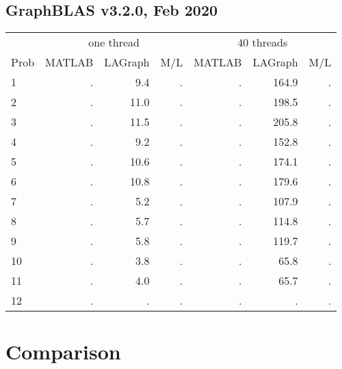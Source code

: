 \documentclass[12pt]{article}
\begin{document}
\subsection{GraphBLAS v3.2.0, Feb 2020}

{\small
\begin{tabular}{l|rr|r||rr|r}
\hline
     & \multicolumn{3}{c}{one thread}                &  \multicolumn{3}{c}{40 threads}  \\
Prob & MATLAB         & LAGraph        & M/L         &   MATLAB      & LAGraph       & M/L        \\
\hline
  1  &{           .  }& {         9.4 }&        .    &  {        .  }& {      164.9 }&      .     \\
  2  &{           .  }& {        11.0 }&        .    &  {        .  }& {      198.5 }&      .     \\
  3  &{           .  }& {        11.5 }&        .    &  {        .  }& {      205.8 }&      .     \\
\hline
  4  &{           .  }& {         9.2 }&        .    &  {        .  }& {      152.8 }&      .     \\
  5  &{           .  }& {        10.6 }&        .    &  {        .  }& {      174.1 }&      .     \\
  6  &{           .  }& {        10.8 }&        .    &  {        .  }& {      179.6 }&      .     \\
\hline
  7  &{           .  }& {         5.2 }&        .    &  {        .  }& {      107.9 }&      .     \\
  8  &{           .  }& {         5.7 }&        .    &  {        .  }& {      114.8 }&      .     \\
  9  &{           .  }& {         5.8 }&        .    &  {        .  }& {      119.7 }&      .     \\
\hline
 10  &{           .  }& {         3.8 }&        .    &  {        .  }& {       65.8 }&      .     \\
 11  &{           .  }& {         4.0 }&        .    &  {        .  }& {       65.7 }&      .     \\
 12  &{           .  }& {          .  }&        .    &  {        .  }& {         .  }&      .     \\
\end{tabular}
}

\section{Comparison}
\end{document}
